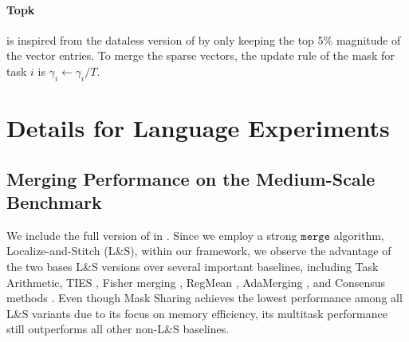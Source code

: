 \paragraph{Topk} is inspired from the dataless version of \citet{he2024localize} by only keeping the top 5\% magnitude of the vector entries. To merge the sparse vectors, the update rule of the mask for task $i$ is $\gamma_i \leftarrow \gamma_i/T$.


\section{Details for Language Experiments}
\label{sec:nlp_details}


\subsection{Merging Performance on the Medium-Scale Benchmark}
\label{sec:medium_nlp_details}
We include the full version of  in . Since we employ a strong $\texttt{merge}$ algorithm, Localize-and-Stitch (L\&S), within our framework, we observe the advantage of the two bases L\&S versions over several important baselines, including Task Arithmetic, TIES \citep{yadav2024ties}, Fisher merging \citep{matena2022merging}, RegMean \citep{jin2022dataless}, AdaMerging \citep{yang2023adamerging}, and Consensus methods \citep{wang2024localizing}. Even though Mask Sharing achieves the lowest performance among all L\&S variants due to its focus on memory efficiency, its multitask performance still outperforms all other non-L\&S baselines.

